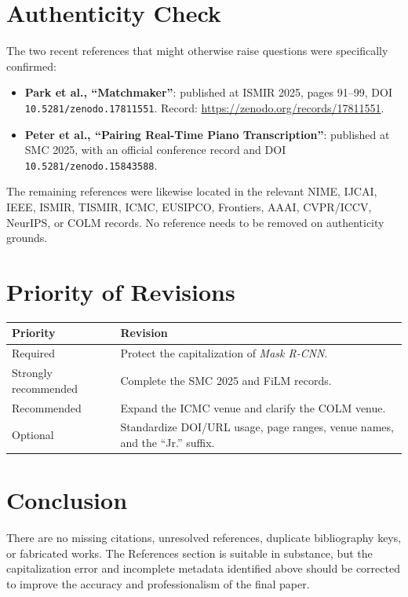 \documentclass[11pt]{article}
\begin{document}
\section{Authenticity Check}

The two recent references that might otherwise raise questions were specifically confirmed:

\begin{itemize}
  \item \textbf{Park et al., ``Matchmaker''}: published at ISMIR 2025, pages 91--99, DOI \texttt{10.5281/zenodo.17811551}. Record: \url{https://zenodo.org/records/17811551}.

  \item \textbf{Peter et al., ``Pairing Real-Time Piano Transcription''}: published at SMC 2025, with an official conference record and DOI \texttt{10.5281/zenodo.15843588}.
\end{itemize}

The remaining references were likewise located in the relevant NIME, IJCAI, IEEE, ISMIR, TISMIR, ICMC, EUSIPCO, Frontiers, AAAI, CVPR/ICCV, NeurIPS, or COLM records. No reference needs to be removed on authenticity grounds.

\section{Priority of Revisions}

\begin{tabular}{@{}p{}p{}@{}}
\toprule
\textbf{Priority} & \textbf{Revision} \\
\midrule
Required & Protect the capitalization of \textit{Mask R-CNN}. \\
Strongly recommended & Complete the SMC 2025 and FiLM records. \\
Recommended & Expand the ICMC venue and clarify the COLM venue. \\
Optional & Standardize DOI/URL usage, page ranges, venue names, and the ``Jr.'' suffix. \\
\bottomrule
\end{tabular}

\section{Conclusion}

There are no missing citations, unresolved references, duplicate bibliography keys, or fabricated works. The References section is suitable in substance, but the capitalization error and incomplete metadata identified above should be corrected to improve the accuracy and professionalism of the final paper.
\end{document}
